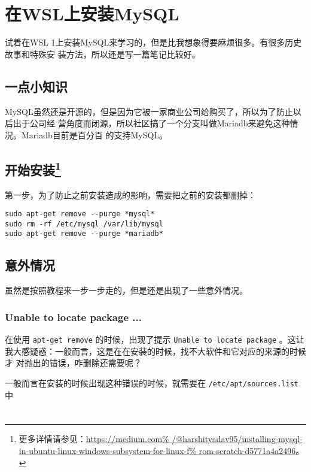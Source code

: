 
\section{在WSL上安装MySQL}

试着在WSL 1上安装MySQL来学习的，但是比我想象得要麻烦很多。有很多历史故事和特殊安
装方法，所以还是写一篇笔记比较好。

\subsection{一点小知识}

MySQL虽然还是开源的，但是因为它被一家商业公司给购买了，所以为了防止以后出于公司经
营角度而闭源，所以社区搞了一个分支叫做Mariadb来避免这种情况。Mariadb目前是百分百
的支持MySQL。

\subsection[开始安装]{开始安装\footnote{更多详情请参见：\url{https://medium.com%
/@harshityadav95/installing-mysql-in-ubuntu-linux-windows-subsystem-for-linux-f%
rom-scratch-d5771a4a2496}。}}

第一步，为了防止之前安装造成的影响，需要把之前的安装都删掉：
\begin{lstlisting}
sudo apt-get remove --purge *mysql*
sudo rm -rf /etc/mysql /var/lib/mysql
sudo apt-get remove --purge *mariadb*
\end{lstlisting}

\subsection{意外情况}

虽然是按照教程来一步一步走的，但是还是出现了一些意外情况。

\subsubsection{Unable to locate package ...}

在使用 \verb|apt-get remove| 的时候，出现了提示 \verb|Unable to locate package|%
。这让我大感疑惑：一般而言，这是在在安装的时候，找不大软件和它对应的来源的时候才
对抛出的错误，咋删除还需要呢？

一般而言在安装的时候出现这种错误的时候，就需要在 \verb|/etc/apt/sources.list| 中



\section{}

